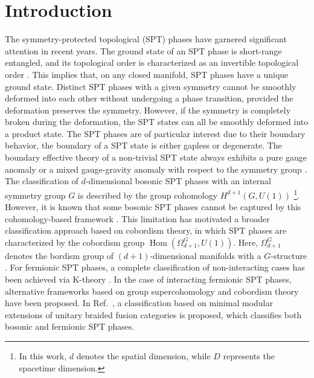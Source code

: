 \documentclass[a4paper,11pt]{article}
\theoremstyle{theorem}
\theoremstyle{remark}
\begin{document}
\section{Introduction}


The symmetry-protected topological (SPT) phases \cite{Haldane1983nonlinear,haldane1983continuum,Affleck1987AKLT,Gu2009SPT,Chen2011classification,Pollmann2012symmetry,Chen20112dSPT,Pollmann2012detection,Schuch2011classifyingSPT,Chen2012SPTboson,Zeng2015} have garnered significant attention in recent years. The ground state of an SPT phase is short-range entangled, and its topological order is characterized as an invertible topological order \cite{Wen2017zoo,freed2021reflection}. This implies that, on any closed manifold, SPT phases have a unique ground state.
Distinct SPT phases with a given symmetry cannot be smoothly deformed into each other without undergoing a phase transition, provided the deformation preserves the symmetry. However, if the symmetry is completely broken during the deformation, the SPT states can all be smoothly deformed into a product state.
The SPT phases are of particular interest due to their boundary behavior, the boundary of a SPT state is either gapless or degenerate. 
The boundary effective theory of a non-trivial SPT state always exhibits a pure gauge anomaly or a mixed gauge-gravity anomaly with respect to the symmetry group \cite{Wen2013SPT}.
The classification of \( d \)-dimensional bosonic SPT phases with an internal symmetry group \( G \) is described by the group cohomology \( H^{d+1}(G, U(1)) \) \cite{Wen2013SPT, Chen2013SPTclassification}\footnote{In this work, \( d \) denotes the spatial dimension, while \( D \) represents the spacetime dimension.}. However, it is known that some bosonic SPT phases cannot be captured by this cohomology-based framework \cite{Vishwanath2013physics, Wang2013SPT, Burnell2014spt}. This limitation has motivated a broader classification approach based on cobordism theory, in which SPT phases are characterized by the cobordism group \( \operatorname{Hom}(\Omega_{d+1}^G, U(1)) \). Here, \( \Omega_{d+1}^G \) denotes the bordism group of \((d+1)\)-dimensional manifolds with a \( G \)-structure \cite{kapustin2014SPT, kapustin2014bosonicSPT, freed2021reflection, yonekura2019cobordism}.
For fermionic SPT phases, a complete classification of non-interacting cases has been achieved via K-theory \cite{kitaev2009periodic, ryu2010topological}. In the case of interacting fermionic SPT phases, alternative frameworks based on group supercohomology \cite{Gu2014SPTfermion} and cobordism theory \cite{kapustin2015fermionic} have been proposed.
In Ref.~\cite{kong2020classification}, a classification based on minimal modular extensions of unitary braided fusion categories is proposed, which classifies both bosonic and fermionic SPT phases.
\end{document}
